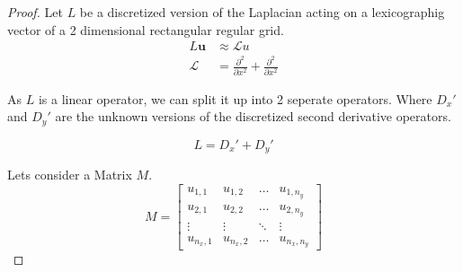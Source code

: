 \documentclass{article}
\begin{document}
\begin{proof}
    
Let $L$ be a discretized version of the Laplacian acting on a lexicographig vector of a 2 dimensional rectangular regular grid.
\begin{align}
    L\mathbf{u} &\approx \mathcal{L} u\\
    \mathcal{L} &= \frac{\partial^2}{\partial x^2} + \frac{\partial^2}{\partial x^2}
\end{align}

As $L$ is a linear operator, we can split it up into 2 seperate operators. Where $D_x'$ and $D_y'$ are the unknown versions of the discretized second derivative operators.

\begin{equation}
    L = D_x' + D_y'
\end{equation}

Lets consider a Matrix $M$.
\begin{equation}
    M = \begin{bmatrix}
        u_{1,1} & u_{1,2} & \dots & u_{1,n_y} \\
        u_{2,1} & u_{2,2} & \dots & u_{2,n_y} \\
        \vdots & \vdots & \ddots & \vdots \\
        u_{n_x,1} & u_{n_x,2} & \dots & u_{n_x,n_y}
    \end{bmatrix}
\end{equation}


\end{proof}
\end{document}
